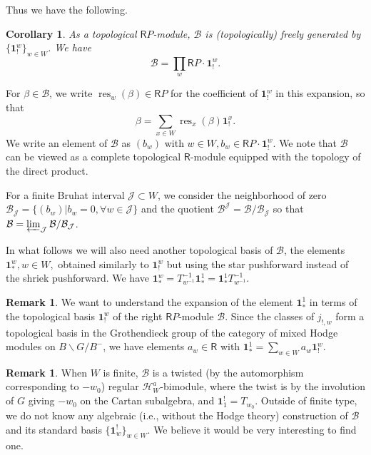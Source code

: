 \documentclass{amsart}
\newcommand{\Ring}{\mathsf{R}}
\newcommand{\bone}{\mathbf{1}}
\newtheorem{Cor}[Thm]{Corollary}
\theoremstyle{definition}
\newtheorem{Rem}[Thm]{Remark}
\numberwithin{equation}{section}
\begin{document}
Thus we have the following.
\begin{Cor}\label{cor:levelzero-a-t-relation}
    As a { topological} $\Ring P$-module, $\mathcal{B}$ is {(topologically)} freely generated by $\{\bone_!^w\}_{w \in W}$.
We have
$$\mathcal{B}=\prod_{w} \Ring P\cdot \bone_!^w.$$
\end{Cor}

For $\beta\in\mathcal B$, we write $\operatorname{res}_w(\beta)\in\Ring P$ for
the coefficient of $\bone_!^w$ in this expansion, so that
\begin{equation}\label{eq:res_defn}
\beta=\sum_{x\in W}\operatorname{res}_x(\beta)\bone^x_!.
\end{equation}
We write an element of $\mathcal{B}$ as $(b_w)$ with $w\in W, b_w\in \Ring P\cdot \bone_!^w$.
{ We note that $\mathcal{B}$ can be viewed as} a complete topological { $\Ring$-module} equipped with the topology of the direct product.

For a finite Bruhat interval $\mathcal{J}\subset W$, we consider the neighborhood of zero $\mathcal{B}_{\mathcal{J}}=\{(b_w)| b_w=0, \forall w\in \mathcal{J}\}$ and the quotient $\mathcal{B}^{\mathcal{J}}=\mathcal{B}/\mathcal{B}_{\mathcal{J}}$ so that $\mathcal{B}=\varprojlim_{\mathcal{J}} \mathcal{B}/\mathcal{B}_{\mathcal{J}}$.

In what follows we will also need another topological basis of $\mathcal{B}$, the elements $\bone_*^w, w\in W,$ obtained similarly to $\bone_!^w$ but using the star pushforward instead of the shriek pushforward. We have $\bone_*^w=T_{w^{-1}}^{-1}\bone_*^1=\bone_*^1 T_{w^{-1}}^{-1}$.

\begin{Rem}\label{Rem:star_shriek_expansion}
We want to understand the expansion of the element $\bone_*^1$ in terms of the topological basis $\bone_!^w$ of the right $\Ring P$-module $\mathcal{B}$. Since the classes of $j_{!,w}$ form a topological basis in the Grothendieck group of the category of mixed Hodge modules on $B\backslash G/B^-$, we have elements $a_w\in \Ring$ with $\bone_*^1=\sum_{w\in W}a_w \bone_!^w$.
\end{Rem}

\begin{Rem}\label{Rem:finite_type}
{ When $W$ is finite, $\mathcal{B}$ is a twisted (by the automorphism corresponding to $-w_0$) regular $\mathcal{H}^a_W$-bimodule, where the twist is by the involution of $G$ giving $-w_0$ on the Cartan subalgebra, and $\bone^!_1=T_{w_0}$. Outside of finite type, we do not know any algebraic (i.e., without the Hodge theory) construction of $\mathcal{B}$ and its standard basis $\{\bone^!_w\}_{w \in W}$. We believe it would be very interesting to find one.}
\end{Rem}
\end{document}
